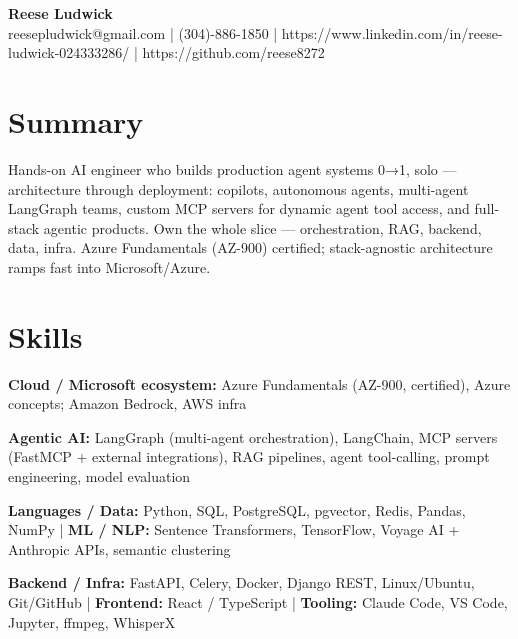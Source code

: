 \documentclass[10pt]{article}
\begin{document}
\begin{center}
{\fontsize{14}{16}\selectfont\bfseries Reese Ludwick}\\[1pt]
{\fontsize{9}{11}\selectfont reesepludwick@gmail.com | (304)-886-1850 | https://www.linkedin.com/in/reese-ludwick-024333286/ | https://github.com/reese8272}
\end{center}
\vspace{-2pt}
\section*{Summary}
\noindent Hands-on AI engineer who builds production agent systems 0→1, solo — architecture through deployment: copilots, autonomous agents, multi-agent LangGraph teams, custom MCP servers for dynamic agent tool access, and full-stack agentic products. Own the whole slice — orchestration, RAG, backend, data, infra. Azure Fundamentals (AZ-900) certified; stack-agnostic architecture ramps fast into Microsoft/Azure.\par
\section*{Skills}
\noindent \textbf{Cloud / Microsoft ecosystem:} Azure Fundamentals (AZ-900, certified), Azure concepts; Amazon Bedrock, AWS infra\par
\noindent \textbf{Agentic AI:} LangGraph (multi-agent orchestration), LangChain, MCP servers (FastMCP + external integrations), RAG pipelines, agent tool-calling, prompt engineering, model evaluation\par
\noindent \textbf{Languages / Data:} Python, SQL, PostgreSQL, pgvector, Redis, Pandas, NumPy | \textbf{ML / NLP:} Sentence Transformers, TensorFlow, Voyage AI + Anthropic APIs, semantic clustering\par
\noindent \textbf{Backend / Infra:} FastAPI, Celery, Docker, Django REST, Linux/Ubuntu, Git/GitHub | \textbf{Frontend:} React / TypeScript | \textbf{Tooling:} Claude Code, VS Code, Jupyter, ffmpeg, WhisperX\par
\end{document}
